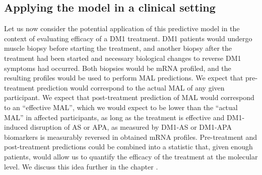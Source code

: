 \documentclass[10pt,letterpaper]{article}
\begin{document}
\subsection*{Applying the model in a clinical setting}

Let us now consider the potential application of this predictive model in the context of evaluating efficacy of a DM1 treatment. DM1 patients would undergo muscle biopsy before starting the treatment, and another biopsy after the treatment had been started and necessary biological changes to reverse DM1 symptoms had occurred. Both biopsies would be mRNA profiled, and the resulting profiles would be used to perform MAL predictions. We expect that pre-treatment prediction would correspond to the actual MAL of any given participant. We expect that post-treatment prediction of MAL would correspond to an ``effective MAL'', which we would expect to be lower than the ``actual MAL'' in affected participants, as long as the treatment is effective and DM1-induced disruption of AS or APA, as measured by DM1-AS or DM1-APA biomarkers is measurably reversed in obtained mRNA profiles. Pre-treatment and post-treatment predictions could be combined into a statistic that, given enough patients, would allow us to quantify the efficacy of the treatment at the molecular level. We discuss this idea further in the chapter .
\end{document}
